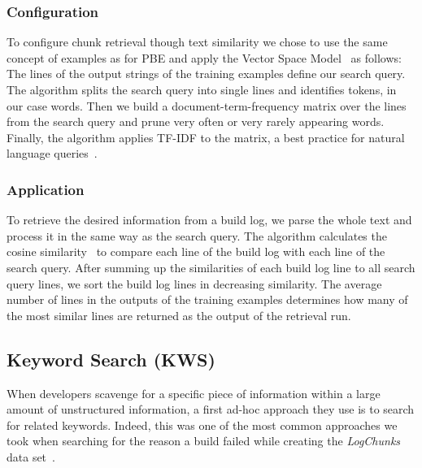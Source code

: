 \subsubsection{Configuration}
To configure chunk retrieval though text similarity we chose to use
the same concept of examples as for PBE
and apply the Vector Space Model~\cite{schutze2008introduction}
as follows:
The lines of the output strings of the training examples define our
search query.
The algorithm splits the search query into single lines and
identifies tokens, in our case words.
Then we build a
document-term-frequency matrix over the lines from the search query
and prune very often or very rarely appearing words.
Finally, the
algorithm applies TF-IDF to the matrix, a best practice for natural
language queries~\cite{lee1997document}.

\subsubsection{Application}
To retrieve the desired information from a build log, we parse the
whole text and process it in the same way as the search query.
The algorithm calculates the cosine
similarity~\cite{korenius2007principal} to compare each line of the
build log with each line of the search query.
After summing up the
similarities of each build log line to all search query lines, we sort
the build log lines in decreasing similarity.
The average number of
lines in the outputs of the training examples determines how many of
the most similar lines are returned as the output of the retrieval
run.

\subsection{Keyword Search (KWS)}
\label{sec:expl-skws}
When developers scavenge for a specific piece of information within a
large amount of unstructured information, a first ad-hoc approach they
use is to search for related keywords.
Indeed, this was one of the
most common approaches we took when searching for the reason a build
failed while creating the \emph{LogChunks} data
set~\cite{brandt2020logchunks}.

